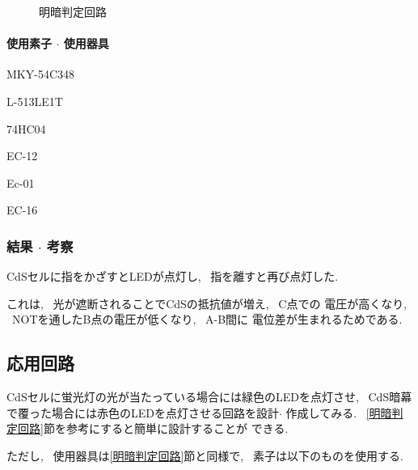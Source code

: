 \documentclass[titlepage]{jsarticle}
\begin{document}
            \begin{figure}[ht]
                \centering
                \caption{明暗判定回路}
                \label{fig:判定回路}
            \end{figure}

            \paragraph{使用素子 $\cdot$ 使用器具}
                \begin{description}
                    \setlength{\leftskip}{1.5em}
                    \item[CdSセル] MKY-54C348
                    \item[LED] L-513LE1T
                    \item[IC] 74HC04
                    \item[デジタルマルチメータ] EC-12
                    \item[直流電源] Ec-01
                    \item[ブレッドボード] EC-16 
                \end{description}

        \subsubsection{結果 $\cdot$ 考察} \label{明暗判定考察}
            CdSセルに指をかざすとLEDが点灯し, ~指を離すと再び点灯した.

            これは, ~光が遮断されることでCdSの抵抗値が増え, ~C点での
            電圧が高くなり, ~NOTを通したB点の電圧が低くなり, ~A-B間に
            電位差が生まれるためである.

    \subsection{応用回路}
        CdSセルに蛍光灯の光が当たっている場合には緑色のLEDを点灯させ,
        ~CdS暗幕で覆った場合には赤色のLEDを点灯させる回路を設計$\cdot$
        作成してみる. ~\ref{明暗判定回路}節を参考にすると簡単に設計することが
        できる.

        ただし, ~使用器具は\ref{明暗判定回路}節と同様で,
        ~素子は以下のものを使用する.
\end{document}
